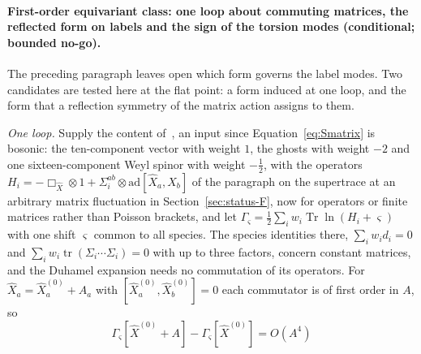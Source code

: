 \paragraph{First-order equivariant class: one loop about commuting matrices, the reflected form on labels and the sign of the torsion modes (conditional; bounded no-go).}
The preceding paragraph leaves open which form governs the label modes. Two candidates are tested here at the flat point: a form induced at one loop, and the form that a reflection symmetry of the matrix action assigns to them.

\emph{One loop.} Supply the content of~\cite{IKKT1997}, an input since Equation~\eqref{eq:Smatrix} is bosonic: the ten-component vector with weight \(1\), the ghosts with weight \(-2\) and one sixteen-component Weyl spinor with weight \(-\tfrac12\), with the operators \(H_i=-\Box_{\hat X}\otimes1+\Sigma_i^{ab}\otimes\mathrm{ad}[\hat X_a,\hat X_b]\) of the paragraph on the supertrace at an arbitrary matrix fluctuation in Section~\ref{sec:status-F}, now for operators or finite matrices rather than Poisson brackets, and let \(\Gamma_\varsigma=\tfrac12\sum_iw_i\operatorname{Tr}\ln(H_i+\varsigma)\) with one shift \(\varsigma\) common to all species. The species identities there, \(\sum_iw_id_i=0\) and \(\sum_iw_i\operatorname{tr}(\Sigma_i\cdots\Sigma_i)=0\) with up to three factors, concern constant matrices, and the Duhamel expansion needs no commutation of its operators. For \(\hat X_a=\hat X^{(0)}_a+A_a\) with \([\hat X^{(0)}_a,\hat X^{(0)}_b]=0\) each commutator is of first order in \(A\), so
\[
\Gamma_\varsigma[\hat X^{(0)}+A]-\Gamma_\varsigma[\hat X^{(0)}]=O(A^4)
\]
